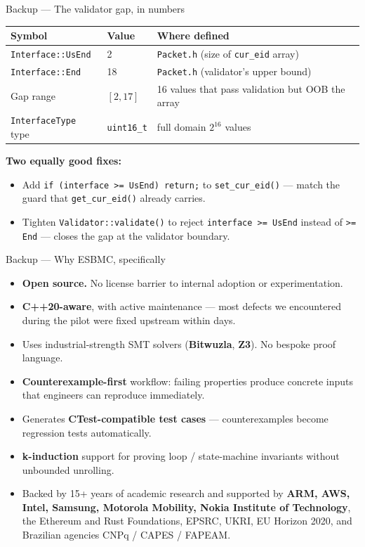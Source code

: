 \documentclass[aspectratio=169,11pt]{beamer}
\newcommand{\hil}[1]{\textbf{\textcolor{nvgreendark}{#1}}}
\begin{document}
\begin{frame}{Backup --- The validator gap, in numbers}
  \footnotesize
  \begin{tabular}{@{} l l l @{}}
    \toprule
    \textbf{Symbol} & \textbf{Value} & \textbf{Where defined} \\
    \midrule
    \texttt{Interface::UsEnd}   & 2  & \texttt{Packet.h} (size of \texttt{cur\_eid} array) \\
    \texttt{Interface::End}     & 18 & \texttt{Packet.h} (validator's upper bound) \\
    Gap range                   & $[2, 17]$ & 16 values that pass validation but OOB the array \\
    \texttt{InterfaceType} type & \texttt{uint16\_t} & full domain $2^{16}$ values \\
    \bottomrule
  \end{tabular}

  \vspace{0.6em}
  \textbf{Two equally good fixes:}
  \begin{itemize}
    \item Add \texttt{if (interface >= UsEnd) return;} to \texttt{set\_cur\_eid()}
          — match the guard that \texttt{get\_cur\_eid()} already carries.
    \item Tighten \texttt{Validator::validate()} to reject
          \texttt{interface >= UsEnd} instead of \texttt{>= End} — closes the gap
          at the validator boundary.
  \end{itemize}
\end{frame}

\begin{frame}{Backup --- Why ESBMC, specifically}
  \footnotesize
  \begin{itemize}
    \item \hil{Open source.} No license barrier to internal
          adoption or experimentation.
    \item \hil{C++20-aware}, with active maintenance — most defects we
          encountered during the pilot were fixed upstream within days.
    \item Uses industrial-strength SMT solvers
          (\hil{Bitwuzla}, \hil{Z3}). No bespoke proof language.
    \item \hil{Counterexample-first} workflow: failing properties produce
          concrete inputs that engineers can reproduce immediately.
    \item Generates \hil{CTest-compatible test cases} — counterexamples
          become regression tests automatically.
    \item \hil{k-induction} support for proving loop / state-machine
          invariants without unbounded unrolling.
    \item Backed by 15+ years of academic research and supported by
          \hil{ARM, AWS, Intel, Samsung, Motorola Mobility, Nokia Institute of
          Technology}, the Ethereum and Rust Foundations, EPSRC, UKRI, EU
          Horizon 2020, and Brazilian agencies CNPq / CAPES / FAPEAM.
  \end{itemize}
\end{frame}
\end{document}
